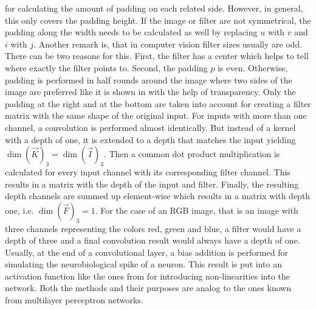 for calculating the amount of padding on each related side.
However, in general, this only covers the padding height.
If the image or filter are not symmetrical, the padding along the width needs to be calculated as well by replacing $u$ with $v$ and $i$ with $j$.
Another remark is, that in computer vision filter sizes usually are odd.
There can be two reasons for this.
First, the filter has a center which helps to tell where exactly the filter points to.
Second, the padding $p$ is even.
Otherwise, padding is performed in half rounds around the image where two sides of the image are preferred like it is shown in  with the help of transparency.
Only the padding at the right and at the bottom are taken into account for creating a filter matrix with the same shape of the original input.
For inputs with more than one channel, a convolution is performed almost identically.
But instead of a kernel with a depth of one, it is extended to a depth that matches the input yielding $\dim\left(\vec{K}\right)_3 = \dim\left(\vec{I}\right)_3$.
Then a common dot product multiplication is calculated for every input channel with its corresponding filter channel.
This results in a matrix with the depth of the input and filter.
Finally, the resulting depth channels are summed up element-wise which results in a matrix with depth one, i.e. $\dim\left(\vec{F}\right)_3 = 1$.
For the case of an RGB image, that is an image with three channels representing the colors red, green and blue, a filter would have a depth of three and a final convolution result would always have a depth of one.
Usually, at the end of a convolutional layer, a bias addition is performed for simulating the neurobiological spike of a neuron.
This result is put into an activation function like the ones from  for introducing non-linearities into the network.
Both the methods and their purposes are analog to the ones known from multilayer perceptron networks.

